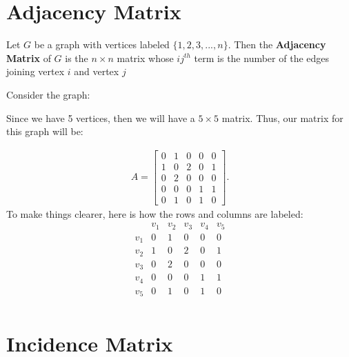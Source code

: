 \documentclass{report}
\begin{document}
    \section{\LARGE Adjacency Matrix}
    \bigbreak \noindent 
    \smallbreak \noindent
    \begin{definition}
        Let $G $ be a graph with vertices labeled $\{1,2,3,...,n\} $. Then the \textbf{Adjacency Matrix} of $G$ is the $n \times n$ matrix whose $ij^{th}$ term is the number of the edges joining vertex $i $ and vertex $j $
    \end{definition}
    \bigbreak \noindent 
    Consider the graph:
    \bigbreak \noindent 
    \begin{minipage}{0.47\textwidth}
    \end{minipage}
    \begin{minipage}{0.47\textwidth}
    Since we have 5 vertices, then we will have a $5 \times 5$ matrix. Thus, our matrix for this graph will be:

    \begin{align*}
        A = \begin{bmatrix}
            0 & 1 & 0 & 0 & 0 \\
            1 & 0  & 2 & 0 & 1 \\
            0 & 2 & 0 & 0 & 0  \\
            0 & 0 & 0 & 1 & 1 \\
            0 & 1 & 0& 1 & 0 
        \end{bmatrix}
    .\end{align*}
    To make things clearer, here is how the rows and columns are labeled:
            \[
    \begin{array}{c|ccccc}
     & v_1 & v_2 & v_3 & v_4 & v_5 \\
    \hline
    v_1 & 0 & 1 & 0 & 0 & 0 \\
    v_2 & 1 & 0 & 2 & 0 & 1 \\
    v_3 & 0 & 2 & 0 & 0 & 0 \\
    v_4 & 0 & 0 & 0 & 1 & 1 \\
    v_5 & 0 & 1 & 0 & 1 & 0 \\
    \end{array}
    \]
    \end{minipage}

    \pagebreak \bigbreak \noindent 
    \section{\LARGE Incidence Matrix}
    \bigbreak \noindent 





    
    
    
    
    
    

     
\end{document}
